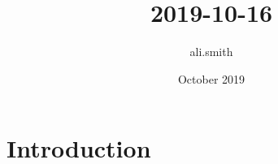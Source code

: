 \documentclass{article}
\title{2019-10-16}
\author{ali.smith }
\date{October 2019}
\begin{document}
\maketitle

\section{Introduction}
\end{document}
